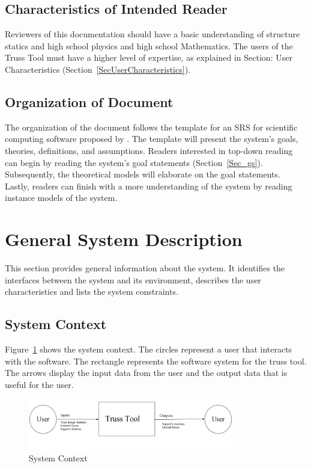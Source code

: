\documentclass[12pt]{article}
\begin{document}
\subsection{Characteristics of Intended Reader} \label{sec_IntendedReader}
Reviewers of this documentation should have a basic understanding of structure statics and high school physics and high school Mathematics. The users of the Truss Tool must have a higher level of expertise, as explained in Section: User Characteristics (Section~\ref{SecUserCharacteristics}). 

\subsection{Organization of Document}
The organization of the document follows the template for an SRS for scientific computing software proposed by \citet{SmithandLai2005}. The template will present the system's goals, theories, definitions, and assumptions. Readers interested in top-down reading can begin by reading the system's goal statements (Section~\ref{Sec_gs}). Subsequently, the theoretical models will elaborate on the goal statements. Lastly, readers can finish with a more  understanding of the system by reading instance models of the system.

\section{General System Description}

This section provides general information about the system.  It identifies the interfaces between the system and its environment, describes the user characteristics and lists the system constraints. 

\subsection{System Context}
Figure~\ref{Fig_SystemContext} shows the system context. The circles 
represent a user that interacts with the software. The rectangle represents the software system for the truss tool. The arrows display the input data from the user and the output data that is useful for the user.

\begin{figure}[h!]
\begin{center}
 \includegraphics[width=0.8\textwidth]{systemcontext.jpg}
\caption{System Context}
\label{Fig_SystemContext} 
\end{center}
\end{figure}
\end{document}
